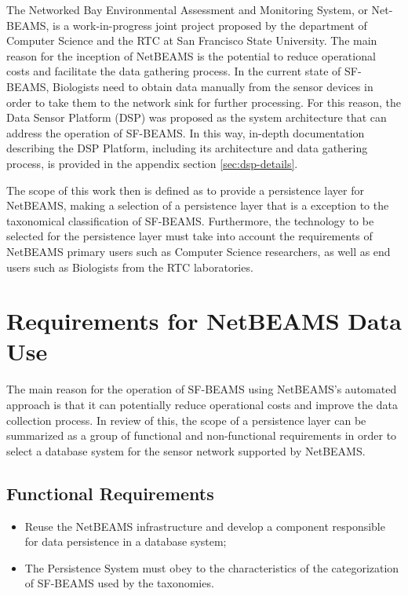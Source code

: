 The Networked Bay Environmental Assessment and Monitoring System, or Net-BEAMS,
is a work-in-progress joint project proposed by the department of Computer
Science and the RTC at San Francisco State University. The main reason for the
inception of NetBEAMS is the potential to reduce operational costs and
facilitate the data gathering process. In the current state of SF-BEAMS,
Biologists need to obtain data manually from the sensor devices in order to
take them to the network sink for further processing. For this reason, the Data
Sensor Platform (DSP) \cite{netbeams2009} was proposed as the system
architecture that can address the operation of SF-BEAMS. In this way, in-depth
documentation describing the DSP Platform, including its architecture and data
gathering process, is provided in the appendix section \ref{sec:dsp-details}.

The scope of this work then is defined as to provide a persistence layer for
NetBEAMS, making a selection of a persistence layer that is a exception to the
taxonomical classification of SF-BEAMS. Furthermore, the technology to be
selected for the persistence layer must take into account the requirements of
NetBEAMS primary users such as Computer Science researchers, as well as end
users such as Biologists from the RTC laboratories.

\section{Requirements for NetBEAMS Data Use}

The main reason for the operation of SF-BEAMS using NetBEAMS's automated
approach is that it can potentially reduce operational costs and improve the
data collection process. In review of this, the scope of a persistence layer
can be summarized as a group of functional and non-functional requirements in
order to select a database system for the sensor network supported by NetBEAMS.

\subsection{Functional Requirements}

\begin{itemize}
  \item Reuse the NetBEAMS infrastructure and develop a component responsible
  for data persistence in a database system;
  \item The Persistence System must obey to the characteristics of the
  categorization of SF-BEAMS used by the taxonomies.
\end{itemize}

